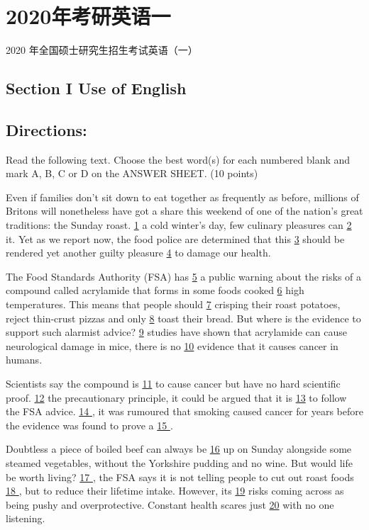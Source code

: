 \documentclass[UTF8,11pt]{ctexart}
\begin{document}
\section*{2020年考研英语一}
2020 年全国硕士研究生招生考试英语（一）


\subsection*{\textbf{Section I Use of English}}


\subsection*{\textbf{Directions:}}


Read the following text. Choose the best word(s) for each numbered blank and mark A, B, C or D on the ANSWER SHEET. (10 points)


Even if families don’t sit down to eat together as frequently as before, millions of Britons will nonetheless have got a share this weekend of one of the nation’s great traditions: the Sunday roast. \uline{1} a cold winter’s day, few culinary pleasures can \uline{2} it. Yet as we report now, the food police are determined that this \uline{3} should be rendered yet another guilty pleasure \uline{4} to damage our health.


The Food Standards Authority (FSA) has \uline{5} a public warning about the risks of a compound called acrylamide that forms in some foods cooked \uline{6} high temperatures. This means that people should \uline{7} crisping their roast potatoes, reject thin-crust pizzas and only \uline{8} toast their bread. But where is the evidence to support such alarmist advice? \uline{9} studies have shown that acrylamide can cause neurological damage in mice, there is no \uline{10} evidence that it causes cancer in humans.


Scientists say the compound is \uline{11} to cause cancer but have no hard scientific proof. \uline{12} the precautionary principle, it could be argued that it is \uline{13} to follow the FSA advice. \uline{14 }, it was rumoured that smoking caused cancer for years before the evidence was found to prove a \uline{15 }.


Doubtless a piece of boiled beef can always be \uline{16} up on Sunday alongside some steamed vegetables, without the Yorkshire pudding and no wine. But would life be worth living? \uline{17 }, the FSA says it is not telling people to cut out roast foods \uline{18 }, but to reduce their lifetime intake. However, its \uline{19} risks coming across as being pushy and overprotective. Constant health scares just \uline{20} with no one listening.
\end{document}
